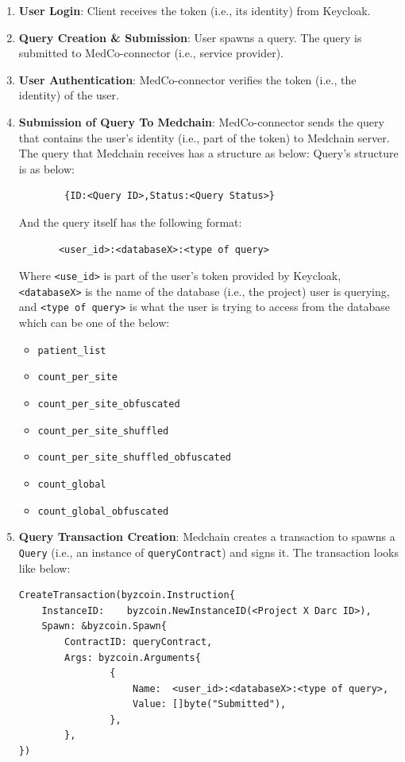 \begin{enumerate}
    \item \textbf{User Login}: Client receives the token (i.e., its identity) from Keycloak.
    
    \item \textbf{Query Creation \& Submission}: User spawns a query. The query is submitted to MedCo-connector (i.e., service provider). 
    
    \item \textbf{User Authentication}: MedCo-connector verifies the token (i.e., the identity) of the user. 
    
    \item \textbf{Submission of Query To Medchain}: MedCo-connector sends the query that contains the user’s identity (i.e., part of the token) to Medchain server. The query that Medchain receives has a structure as below:
    Query's structure is as below:
    \begin{verbatim}
        {ID:<Query ID>,Status:<Query Status>}
    \end{verbatim}
   And the query itself has the following format:
   \begin{verbatim}
       <user_id>:<databaseX>:<type of query>
   \end{verbatim}
   Where \texttt{<use\_id>} is part of the user's token provided by Keycloak, \texttt{<databaseX>} is the name of the database (i.e., the project) user is querying, and \texttt{<type of query>} is what the user is trying to access from the database which can be one of the below:
   \begin{itemize}
        \item \texttt{patient\_list}
        \item \texttt{count\_per\_site}
        \item \texttt{count\_per\_site\_obfuscated}
        \item \texttt{count\_per\_site\_shuffled}
        \item \texttt{count\_per\_site\_shuffled\_obfuscated}
        \item \texttt{count\_global}
        \item \texttt{count\_global\_obfuscated}
   \end{itemize}
   
    \item \textbf{Query Transaction Creation}: \label{workflow:step 5}
    Medchain creates a transaction to spawns a \texttt{Query} (i.e., an instance of \texttt{queryContract}) and signs it. The transaction looks like below:
        \begin{verbatim}
CreateTransaction(byzcoin.Instruction{
    InstanceID:    byzcoin.NewInstanceID(<Project X Darc ID>),
    Spawn: &byzcoin.Spawn{
        ContractID: queryContract,
        Args: byzcoin.Arguments{
                {
                    Name:  <user_id>:<databaseX>:<type of query>,
                    Value: []byte("Submitted"),
                },
        },
})
        \end{verbatim}
        

\end{enumerate}
